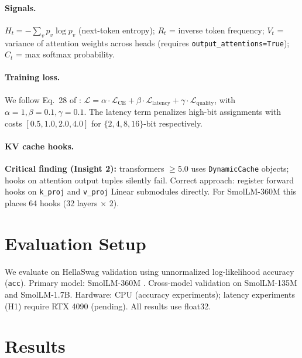 \documentclass[10pt,twocolumn]{article}
\begin{document}
\paragraph{Signals.}
$H_t = -\sum_v p_v \log p_v$ (next-token entropy);
$R_t$ = inverse token frequency;
$V_t$ = variance of attention weights across heads (requires
\texttt{output\_attentions=True});
$C_t$ = max softmax probability.

\paragraph{Training loss.}
We follow Eq.\ 28 of \cite{haeri2026dwb}:
$\mathcal{L} = \alpha \cdot \mathcal{L}_\text{CE} +
\beta \cdot \mathcal{L}_\text{latency} +
\gamma \cdot \mathcal{L}_\text{quality}$,
with $\alpha=1, \beta=0.1, \gamma=0.1$.
The latency term penalizes high-bit assignments with costs
$[0.5, 1.0, 2.0, 4.0]$ for $\{2,4,8,16\}$-bit respectively.

\paragraph{KV cache hooks.}
\textbf{Critical finding (Insight 2):} transformers $\geq$5.0 uses
\texttt{DynamicCache} objects; hooks on attention output tuples silently
fail.
Correct approach: register forward hooks on \texttt{k\_proj} and
\texttt{v\_proj} Linear submodules directly.
For SmolLM-360M this places 64 hooks (32 layers $\times$ 2).

\section{Evaluation Setup}
\label{sec:setup}

We evaluate on HellaSwag validation using unnormalized log-likelihood
accuracy (\texttt{acc}).
Primary model: SmolLM-360M \cite{allal2024smollm}.
Cross-model validation on SmolLM-135M and SmolLM-1.7B.
Hardware: CPU (accuracy experiments); latency experiments (H1) require
RTX 4090 (pending).
All results use float32.

\section{Results}
\label{sec:results}
\end{document}
